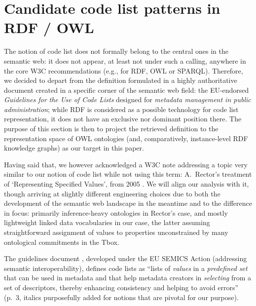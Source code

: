 \section{Candidate code list patterns in RDF / OWL}
\label{s:codelist-def}

The notion of code list does not formally belong to the central ones in the semantic web: it does not appear, at least not under such a calling, anywhere in the core W3C recommendations (e.g., for RDF, OWL or SPARQL). 
Therefore, we decided to depart from the definition formulated in a highly authoritative document created in a specific corner of the semantic web field: the EU-endorsed \emph{Guidelines for the Use of Code Lists} \cite{guide_code_list} designed for  \emph{metadata management in public administration}; while RDF is considered as a possible technology for code list representation, it does not have an exclusive nor dominant position there. 
The purpose of this section is then to project the retrieved definition to the representation space of OWL ontologies (and, comparatively, instance-level RDF knowledge graphs) as our target in this paper.

Having said that, we however acknowledged a W3C note addressing a topic very similar to our notion of code list while not using this term: A.~Rector's treatment of `Representing Specified Values', from 2005 \cite{alanrector}. 
We will align our analysis with it, though arriving at slightly different engineering choices due to both the development of the semantic web landscape in the meantime and to the difference in focus: primarily inference-heavy ontologies in Rector's case, and mostly lightweight linked data vocabularies in our case, the latter assuming straightforward assignment of values to properties unconstrained by many ontological commitments in the Tbox.

The guidelines document \cite{guide_code_list}, developed under the EU SEMICS Action (addressing semantic interoperability), defines code lists as ``lists of \emph{values} in a \emph{predefined set} that can be used in metadata and that help metadata creators in \emph{selecting} from a set of descriptors, thereby enhancing consistency and helping to avoid errors'' (p.~3, italics purposefully added for notions that are pivotal for our purpose). 

